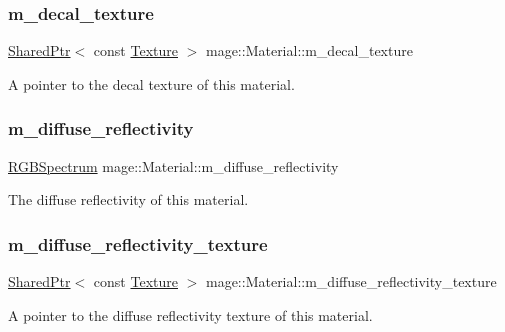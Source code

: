 \subsubsection{\texorpdfstring{m\+\_\+decal\+\_\+texture}{m\_decal\_texture}}
{\footnotesize\ttfamily \hyperlink{namespacemage_a1e01ae66713838a7a67d30e44c67703e}{Shared\+Ptr}$<$ const \hyperlink{classmage_1_1_texture}{Texture} $>$ mage\+::\+Material\+::m\+\_\+decal\+\_\+texture\hspace{0.3cm}{\ttfamily [private]}}

A pointer to the decal texture of this material. \hypertarget{structmage_1_1_material_afd2cc813023698e52edc01b267a17e6c}{}\label{structmage_1_1_material_afd2cc813023698e52edc01b267a17e6c} 
\subsubsection{\texorpdfstring{m\+\_\+diffuse\+\_\+reflectivity}{m\_diffuse\_reflectivity}}
{\footnotesize\ttfamily \hyperlink{structmage_1_1_r_g_b_spectrum}{R\+G\+B\+Spectrum} mage\+::\+Material\+::m\+\_\+diffuse\+\_\+reflectivity\hspace{0.3cm}{\ttfamily [private]}}

The diffuse reflectivity of this material. \hypertarget{structmage_1_1_material_a984d5671d151dfde08589daa0a3cd18e}{}\label{structmage_1_1_material_a984d5671d151dfde08589daa0a3cd18e} 
\subsubsection{\texorpdfstring{m\+\_\+diffuse\+\_\+reflectivity\+\_\+texture}{m\_diffuse\_reflectivity\_texture}}
{\footnotesize\ttfamily \hyperlink{namespacemage_a1e01ae66713838a7a67d30e44c67703e}{Shared\+Ptr}$<$ const \hyperlink{classmage_1_1_texture}{Texture} $>$ mage\+::\+Material\+::m\+\_\+diffuse\+\_\+reflectivity\+\_\+texture\hspace{0.3cm}{\ttfamily [private]}}

A pointer to the diffuse reflectivity texture of this material. \hypertarget{structmage_1_1_material_aee546c25205a3b39ef6fdea3501f3edc}{}\label{structmage_1_1_material_aee546c25205a3b39ef6fdea3501f3edc} 
